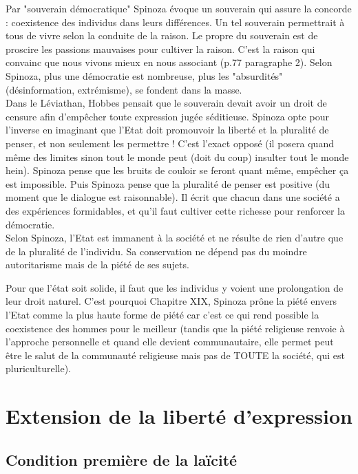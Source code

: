 \documentclass[a4paper,12pt]{article}
\begin{document}
Par "souverain démocratique" Spinoza évoque un souverain qui assure la concorde : coexistence des individus dans leurs différences. Un tel souverain permettrait à tous de vivre selon la conduite de la raison. Le propre du souverain est de proscire les passions mauvaises pour cultiver la raison. C'est la raison qui convainc que nous vivons mieux en nous associant (p.77 paragraphe 2). Selon Spinoza, plus une démocratie est nombreuse, plus les "absurdités" (désinformation, extrémisme), se fondent dans la masse.\\

Dans le Léviathan, Hobbes pensait que le souverain devait avoir un droit de censure afin d'empêcher toute expression jugée séditieuse. Spinoza opte pour l'inverse en imaginant que l'Etat doit promouvoir la liberté et la pluralité de penser, et non seulement les permettre ! C'est l'exact opposé (il posera quand même des limites sinon tout le monde peut (doit du coup) insulter tout le monde hein). Spinoza pense que les bruits de couloir se feront quant même, empêcher ça est impossible. Puis Spinoza pense que la pluralité de penser est positive (du moment que le dialogue est raisonnable). Il écrit que chacun dans une société a des expériences formidables, et qu'il faut cultiver cette richesse pour renforcer la démocratie.\\

Selon Spinoza, l'Etat est immanent à la société et ne résulte de rien d'autre que de la pluralité de l'individu. Sa conservation ne dépend pas du moindre autoritarisme mais de la piété de ses sujets.

Pour que l'état soit solide, il faut que les individus y voient une prolongation de leur droit naturel. C'est pourquoi Chapitre XIX, Spinoza prône la piété envers l'Etat comme la plus haute forme de piété car c'est ce qui rend possible la coexistence des hommes pour le meilleur (tandis que la piété religieuse renvoie à l'approche personnelle et quand elle devient communautaire, elle permet peut être le salut de la communauté religieuse mais pas de TOUTE la société, qui est pluriculturelle).

\section{Extension de la liberté d'expression}

\subsection{Condition première de la laïcité}
\end{document}
